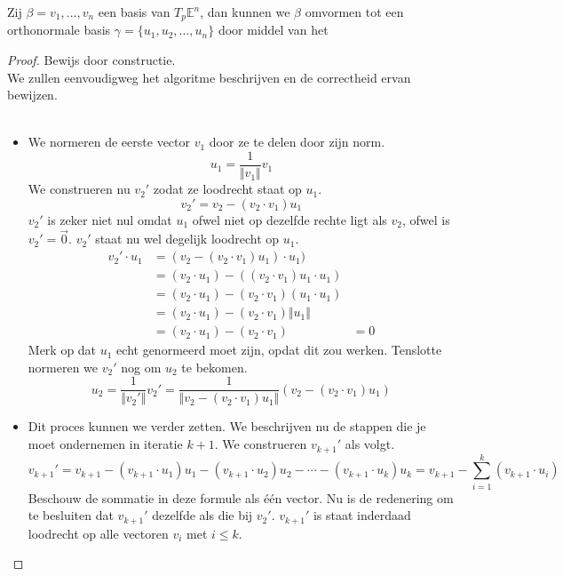 \documentclass[main.tex]{subfiles}
\begin{document}
\begin{st}
  Zij $\beta = v_{1},\dotsc,v_{n}$ een basis van $T_{p}\mathbb{E}^{n}$, dan kunnen we $\beta$ omvormen tot een orthonormale basis $\gamma = \{u_1,u_2,\ldots,u_n\}$ door middel van het 

  \begin{proof}
    Bewijs door constructie.\\
    We zullen eenvoudigweg het algoritme beschrijven en de correctheid ervan bewijzen.\\\\
    \begin{itemize}
    \item 
      We normeren de eerste vector $v_1$ door ze te delen door zijn norm.
      \[
      u_1 = \frac{1}{\Vert v_1\Vert}v_1
      \]
      We construeren nu $v_2'$ zodat ze loodrecht staat op $u_1$.
      \[
      v_2' = v_2 - (v_2 \cdot v_1) u_1
      \]
      $v_2'$ is zeker niet nul omdat $u_1$ ofwel niet op dezelfde rechte ligt als $v_2$, ofwel is $v_2' = \vec{0}$. $v_2'$ staat nu wel degelijk loodrecht op $u_1$.
      \[
      \begin{array}{rll}
        v_2' \cdot u_1 &= (v_2 - (v_2 \cdot v_1) u_1) \cdot u_1) &\\
        &= (v_2 \cdot u_1) - ((v_2 \cdot v_1) u_1 \cdot u_1) &\\
        &= (v_2 \cdot u_1) - (v_2 \cdot v_1) (u_1 \cdot u_1) &\\
        &= ( v_2 \cdot u_1) - (v_2 \cdot v_1) \Vert u_1\Vert &\\
        &= (v_2 \cdot u_1) - (v_2 \cdot v_1) &= 0
      \end{array}
      \]
      Merk op dat $u_1$ echt genormeerd moet zijn, opdat dit zou werken. Tenslotte normeren we $v_2'$ nog om $u_2$ te bekomen.
      \[
      u_2 = \frac{1}{\Vert v_2'\Vert}v_2' = \frac{1}{\Vert v_2 - (v_2 \cdot v_1) u_1\Vert}(v_2 - (v_2 \cdot v_1) u_1)
      \]
    \item
      Dit proces kunnen we verder zetten. We beschrijven nu de stappen die je moet ondernemen in iteratie $k+1$.
      We construeren $v_{k+1}'$ als volgt.
      \[
      v_{k+1}' = v_{k+1} - ( v_{k+1}\cdot u_1 ) u_1 - ( v_{k+1}\cdot u_2 )u_2 - \dotsb - (v_{k+1}\cdot u_k ) u_k
      = v_{k+1} - \sum_{i=1}^k (v_{k+1}\cdot u_i)
      \]
      Beschouw de sommatie in deze formule als \'e\'en vector. Nu is de redenering om te besluiten dat $v_{k+1}'$ dezelfde als die bij $v_2'$.
      $v_{k+1}'$ is staat inderdaad loodrecht op alle vectoren $v_i$ met $i\le k$.


\end{itemize}
\end{proof}
\end{st}
\end{document}
